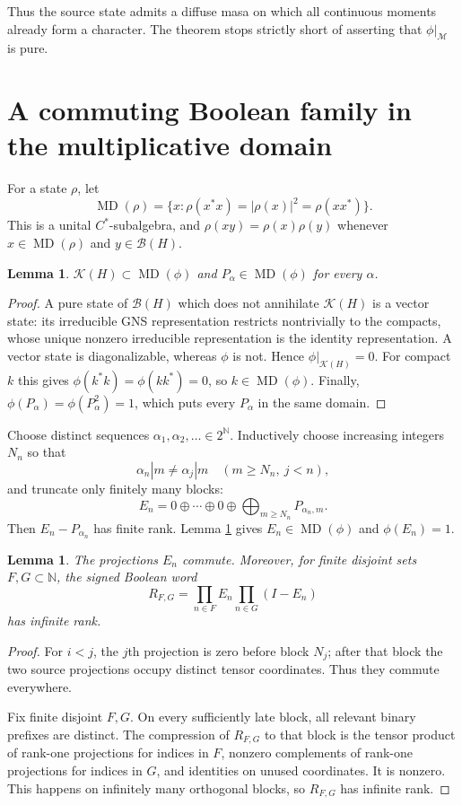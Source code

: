 \documentclass[11pt]{article}
\newtheorem{lemma}[theorem]{Lemma}
\newcommand{\B}{\mathcal B}
\newcommand{\K}{\mathcal K}
\newcommand{\MD}{\operatorname{MD}}
\newcommand{\N}{\mathbb N}
\begin{document}
Thus the source state admits a diffuse masa on which all continuous moments
already form a character.  The theorem stops strictly short of asserting
that $\phi|_{\mathcal M}$ is pure.

\section{A commuting Boolean family in the multiplicative domain}

For a state $\rho$, let
\[
 \MD(\rho)=\{x:\rho(x^*x)=|\rho(x)|^2=\rho(xx^*)\}.
\]
This is a unital $C^*$-subalgebra, and $\rho(xy)=\rho(x)\rho(y)$ whenever
$x\in\MD(\rho)$ and $y\in\B(H)$.

\begin{lemma}\label{lem:md}
$\K(H)\subset\MD(\phi)$ and $P_\alpha\in\MD(\phi)$ for every $\alpha$.
\end{lemma}
\begin{proof}
A pure state of $\B(H)$ which does not annihilate $\K(H)$ is a vector state:
its irreducible GNS representation restricts nontrivially to the compacts,
whose unique nonzero irreducible representation is the identity
representation.  A vector state is diagonalizable, whereas $\phi$ is not.
Hence $\phi|_{\K(H)}=0$.  For compact $k$ this gives
$\phi(k^*k)=\phi(kk^*)=0$, so $k\in\MD(\phi)$.  Finally,
$\phi(P_\alpha)=\phi(P_\alpha^2)=1$, which puts every $P_\alpha$ in the same
domain.
\end{proof}

Choose distinct sequences $\alpha_1,\alpha_2,\ldots\in2^\N$.  Inductively
choose increasing integers $N_n$ so that
\[
 \alpha_n|m\ne\alpha_j|m\quad(m\ge N_n,\ j<n),
\]
and truncate only finitely many blocks:
\[
 E_n=0\oplus\cdots\oplus0\oplus\bigoplus_{m\ge N_n}P_{\alpha_n,m}.
\]
Then $E_n-P_{\alpha_n}$ has finite rank.  Lemma \ref{lem:md} gives
$E_n\in\MD(\phi)$ and $\phi(E_n)=1$.

\begin{lemma}\label{lem:boolean}
The projections $E_n$ commute.  Moreover, for finite disjoint sets
$F,G\subset\N$, the signed Boolean word
\[
 R_{F,G}=\prod_{n\in F}E_n\prod_{n\in G}(I-E_n)
\]
has infinite rank.
\end{lemma}
\begin{proof}
For $i<j$, the $j$th projection is zero before block $N_j$; after that block
the two source projections occupy distinct tensor coordinates.  Thus they
commute everywhere.

Fix finite disjoint $F,G$.  On every sufficiently late block, all relevant
binary prefixes are distinct.  The compression of $R_{F,G}$ to that block is
the tensor product of rank-one projections for indices in $F$, nonzero
complements of rank-one projections for indices in $G$, and identities on
unused coordinates.  It is nonzero.  This happens on infinitely many
orthogonal blocks, so $R_{F,G}$ has infinite rank.
\end{proof}
\end{document}
